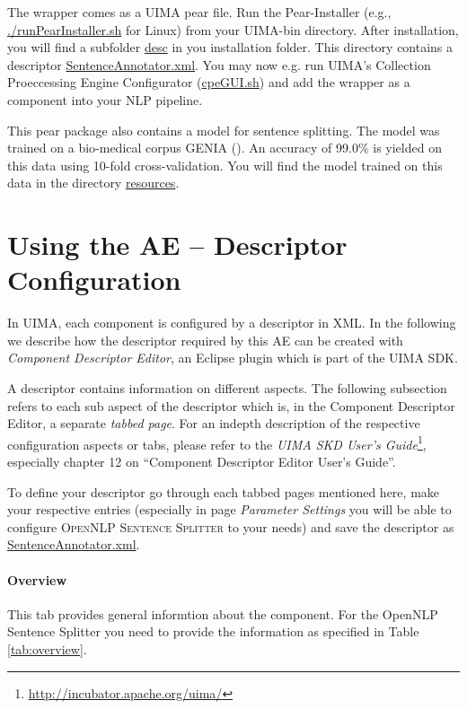 \documentclass[11pt,a4paper,halfparskip]{scrartcl}
\begin{document}
The wrapper comes as a UIMA pear file. Run the Pear-Installer (e.g.,
\url{./runPearInstaller.sh} for Linux) from your UIMA-bin directory.
After installation, you will find a subfolder \url{desc} in you
installation folder. This directory contains a descriptor
\url{SentenceAnnotator.xml}. You may now e.g. run UIMA's
Collection Proeccessing Engine Configurator (\url{cpeGUI.sh}) and add
the wrapper as a component into your NLP pipeline.

This pear package also contains a model for sentence splitting. The
model was trained on a bio-medical corpus \textsc{GENIA} (\cite{ohta02}).
An accuracy of 99.0\% is yielded on this data using 10-fold cross-validation.  
You will find the model trained on this data in the directory \url{resources}.




\section{Using the AE -- Descriptor Configuration}

In UIMA, each component is configured by a descriptor in XML. In the
following we describe how the descriptor required by this AE can be
created with \emph{Component Descriptor Editor}, an Eclipse plugin
which is part of the UIMA SDK.

A descriptor contains information on different aspects. The following
subsection refers to each sub aspect of the descriptor which is, in
the Component Descriptor Editor, a separate \emph{tabbed page}. For an
indepth description of the respective configuration aspects or tabs,
please refer to the \emph{UIMA SKD User's
  Guide}\footnote{\url{http://incubator.apache.org/uima/}}, especially
chapter 12 on ``Component Descriptor Editor User's Guide''.

To define your descriptor go through each tabbed pages mentioned
here, make your respective entries (especially in page \emph{Parameter
Settings} you will be able to configure \textsc{OpenNLP Sentence Splitter} 
to your needs) and save the descriptor as \\ \url{SentenceAnnotator.xml}.

\paragraph{Overview}
This tab provides general informtion about the component. For the
OpenNLP Sentence Splitter you need to provide the information as
specified in Table
\ref{tab:overview}.
\end{document}

